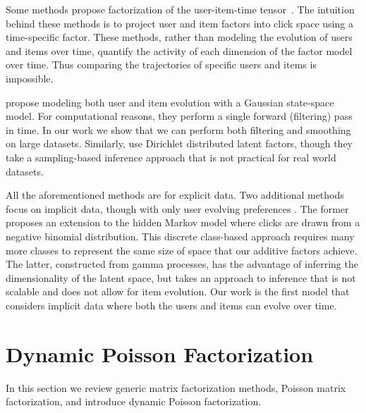 \documentclass{sig-alternate}
\begin{document}
Some methods propose factorization of the user-item-time
tensor~\citep{Karatzoglou:2010, lxiong:10:bptf}. The intuition behind these methods is to 
project user and item factors into click space using a time-specific factor. 
These methods, rather than modeling the evolution of users and items over 
time, quantify the activity of each dimension of the factor model over time. 
Thus comparing the trajectories of specific users and items is impossible.

\citet{DBLP:journals/corr/GultekinP15} propose modeling both user and item evolution with a
Gaussian state-space model. For computational reasons, they perform a single forward (filtering) pass in time. 
In our work we show that we can perform both filtering and smoothing on large
datasets.  Similarly, \citet{Li:2011:CCF:2283696.2283780} use Dirichlet 
distributed latent factors, though they take a sampling-based inference approach that is not practical for real world datasets.

All the aforementioned methods are for explicit data.
Two additional methods focus on implicit data, though with only user evolving preferences
\citep{Sahoo:2012:HMM:2481674.2481689,acharya15}. The former
proposes an extension to the hidden Markov model where clicks are drawn from a negative binomial distribution. This discrete class-based 
approach requires many more classes to represent the
same size of space that our additive factors achieve. The latter,
constructed from gamma processes, has the advantage of inferring
the dimensionality of the latent space, but takes an approach to inference
that is not scalable and does not allow for item evolution. 
Our work is the first model that considers implicit data 
where both the users and items can evolve over time. 


\begin{easylist}

\end{easylist}



 \section{Dynamic Poisson Factorization}\label{sec:model}


\noindent
In this section we review generic matrix factorization methods, Poisson matrix factorization,
and introduce dynamic Poisson factorization.
\end{document}

